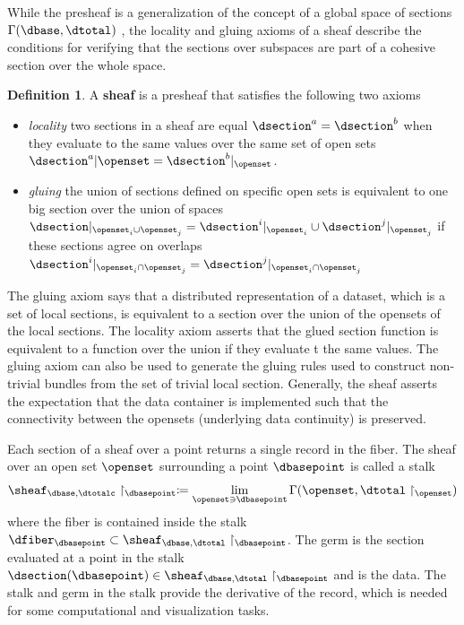 \documentclass[10pt,journal,compsoc]{IEEEtran}
\theoremstyle{definition}
\newtheorem{definition}{Definition}[section]
\theoremstyle{remark}
\begin{document}
While the presheaf is a generalization of the concept of a global space of sections $\Gamma(\dbase, \dtotal)$ \cite{spanier1989algebraic}, the locality and gluing axioms \cite{bakerEuclideanSpaceMathsSheaf} of a sheaf describe the conditions for verifying that the sections over subspaces are part of a cohesive section over the whole space. 
\begin{definition} A \textbf{sheaf} is a presheaf that satisfies the following two axioms
\begin{itemize}
  \item \textit{locality} two sections in a sheaf are equal $\dsection^{a} = \dsection^{b}$ when they evaluate to the same values over the same set of open sets $\dsection^{a}|{\openset} =  \dsection^{b}|_{\openset}$.
  \item \textit{gluing} the union of sections defined on specific open sets is equivalent to one big section over the union of spaces $\dsection|_{\openset_{i} \cup \openset_{j}} = \dsection^{i}|_{\openset_i} \cup \dsection^{j}|_{\openset_j}$ if these sections agree on overlaps $\dsection^{i}|_{\openset_i\cap\openset_j} =  \dsection^{j}|_{\openset_i\cap\openset_j}$
  \end{itemize}
\end{definition}
The gluing axiom says that a distributed representation of a dataset, which is a set of local sections, is equivalent to a section over the union of the opensets of the local sections. The locality axiom asserts that the glued section function is equivalent to a function over the union if they evaluate t the same values. The gluing axiom can also be used to generate the gluing rules used to construct non-trivial bundles from the set of trivial local section. Generally, the sheaf asserts the expectation that the data container is implemented such that the connectivity between the opensets (underlying data continuity) is preserved. 

Each section of a sheaf over a point returns a single record in the fiber. The sheaf over an open set $\openset$ surrounding a point $\dbasepoint$ is called a stalk\cite{StalkSheaf2019}
\begin{equation}
  \label{eq:atct:sheaf:stalk}
    \sheaf_{\dbase, \dtotalc}\restriction_{\dbasepoint}\coloneqq \lim\limits_{\openset\ni \dbasepoint} \Gamma(\openset, \dtotal\restriction_{\openset}) 
\end{equation}
where the fiber is contained inside the stalk  $\dfiber_{\dbasepoint} \subset  \sheaf_{\dbase, \dtotal}\restriction_{\dbasepoint}$. The germ is the section evaluated at a point in the stalk  $\dsection(\dbasepoint) \in \sheaf_{\dbase, \dtotal}\restriction_{\dbasepoint}$ and is the data. The stalk and germ in the stalk provide the derivative of the record, which is needed for some computational and visualization tasks. 
\end{document}
